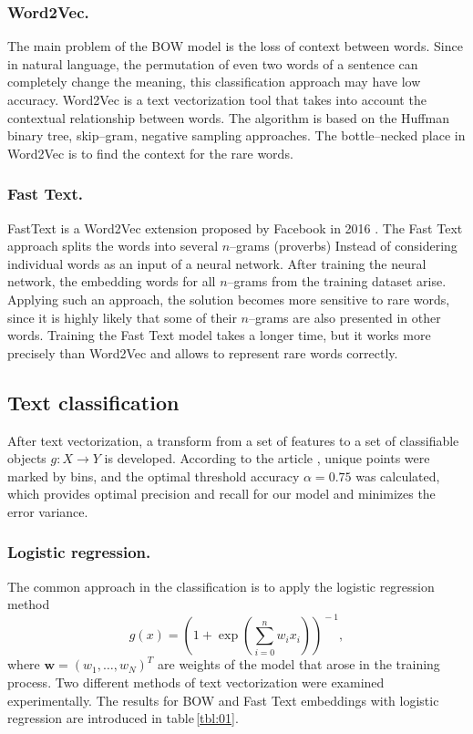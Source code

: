 \documentclass[a4paper]{jpconf}
\begin{document}
\subsubsection*{Word2Vec.}
The main problem of the BOW model is the loss of context between words. Since in natural language, the permutation of even two words of a sentence can completely change the meaning, this classification approach may have low accuracy.
Word2Vec is a text vectorization tool that takes into account the contextual relationship between words. The algorithm is based on the Huffman binary tree, skip--gram, negative sampling approaches. The bottle--necked place in Word2Vec is to find the context for the rare words.

\subsubsection*{Fast Text.}
FastText is a Word2Vec extension proposed by Facebook in 2016 \cite{Mikolov2013,Bojanowski2017}. The Fast Text approach splits the words into several $n$--grams (proverbs) Instead of considering individual words as an input of a neural network. After training the neural network, the embedding words for all $n$--grams from the training dataset arise.
Applying such an approach, the solution becomes more sensitive to rare words, since it is highly likely that some of their $n$--grams are also presented in other words. Training the Fast Text model takes a longer time, but it works more precisely than Word2Vec and allows to represent rare words correctly.

\subsection{Text classification}
After text vectorization, a transform from a set of features to a set of classifiable objects $g: X \rightarrow Y$ is developed.
According to the article \cite{Bommannavar2014,Yang2014}, unique points were marked by bins, and the optimal threshold accuracy $\alpha = 0.75$ was calculated, which provides optimal precision and recall for our model and minimizes the error variance.

\subsubsection*{Logistic regression.}
The common approach in the classification is to apply the logistic regression method
$$
g(x) = \left(1 + \exp{ \left( \sum_{i=0}^n w_i x_i  \right) }\right)^{\!\!-1}\!\!\!\!,
$$
where $\mathbf{w}=(w_1,\ldots, w_N)^T$ are weights of the model that arose in the training process.
Two different methods of text vectorization were examined experimentally.
The results for BOW and Fast Text embeddings with logistic regression are introduced in table\,\ref{tbl:01}.
\end{document}
